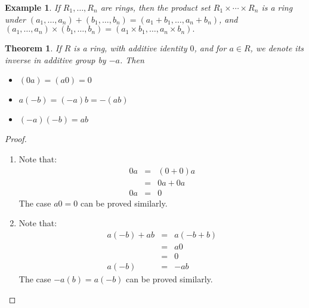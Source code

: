 \documentclass{article}
\theoremstyle{MyNonumberplain}
\theoremstyle{break}
\newtheorem*{proof}{Proof. }
\theoremstyle{break}
\newtheorem{theorem}{Theorem}[section]
\newtheorem{example}{Example}[section]
\theoremstyle{break}
\theoremstyle{definition}
\theoremstyle{break}
\begin{document}
\begin{expbox}
    \begin{example}
        If $R_1, \ldots, R_n$ are rings, then the product set $R_1 \times \cdots
        \times R_n$ is a ring under $(a_1, \ldots, a_n) + (b_1, \ldots, b_n) = (a_1 + b_1, \ldots, a_n + b_n)$, and $(a_1, \ldots, a_n) \times (b_1, \ldots, b_n) = (a_1 \times b_1, \ldots, a_n \times b_n).$
    \end{example}
\end{expbox}

\begin{thmbox}
    \begin{theorem}
        If $R$ is a ring, with additive identity $0$, and for $a \in R$, we denote its
        inverse in additive group by $- a$. Then\\
        \begin{itemize}
        \item $(0 a) = (a 0) = 0$\\
        
        \item $a (- b) = (- a) b = - (a b)$\\
        
        \item $(- a) (- b) = a b$
        \end{itemize}
    \end{theorem}
    \begin{prfbox}
        \begin{proof}
            \begin{enumerate}
                \item Note that:
                \begin{eqnarray*}
                  0 a & = & (0 + 0) a\\
                  & = & 0 a + 0 a\\
                  0 a & = & 0
                \end{eqnarray*}
                The case $a 0 = 0$ can be proved similarly.\bigskip

                \item Note that:
                \begin{eqnarray*}
                  a (- b) + a b & = & a (- b + b)\\
                  & = & a 0\\
                  & = & 0\\
                  a (- b) & = & - a b
                \end{eqnarray*}
                The case $- a (b) = a (- b)$ can be proved similarly.\bigskip


\end{enumerate}
\end{proof}
\end{prfbox}
\end{thmbox}
\end{document}
